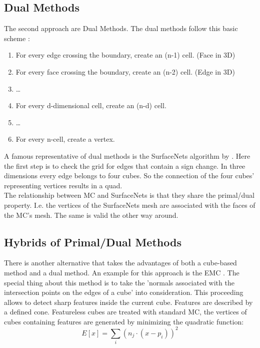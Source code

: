 \subsection{Dual Methods}
The second approach are Dual Methods.
The dual methods follow this basic scheme \cite{Lys12}:

\begin{enumerate}
    \item For every edge crossing the boundary, create an (n-1) cell.  (Face in 3D)
    \item For every face crossing the boundary, create an (n-2) cell. (Edge in 3D)
    \item \dots
    \item For every d-dimensional cell, create an (n-d) cell.
    \item \dots
    \item For every n-cell, create a vertex.
\end{enumerate}

A famous representative of dual methods is the SurfaceNets algorithm by \cite{Gib98}. Here the first step is to check the grid for edges that contain a sign change. In three dimensions every edge belongs to four cubes. So the connection of the four cubes' representing vertices results in a quad.\\

The relationship between \ac{MC} and SurfaceNets is that they share the primal/dual property.
I.e. the vertices of the SurfaceNets mesh are associated with the faces of the \ac{MC}'s mesh.
The same is valid the other way around. \cite{Ju02}

\subsection{Hybrids of Primal/Dual Methods}

There is another alternative that takes the advantages of both a cube-based method and a dual method. An example for this approach is the \ac{EMC} \cite{Ram08}. The special thing about this method is to take the 'normals associated with the intersection points on the edges of a cube' \cite{Ju02} into consideration. This proceeding allows to detect sharp features inside the current cube. Features are described by a defined cone. Featureless cubes are treated with standard \ac{MC}, the vertices of cubes containing features are generated by minimizing the quadratic function: 
\begin{equation}
	\label{eq:QEF}
	E[x] = \sum\limits_{i} (n_j \cdot (x-p_i))^2
\end{equation} 

